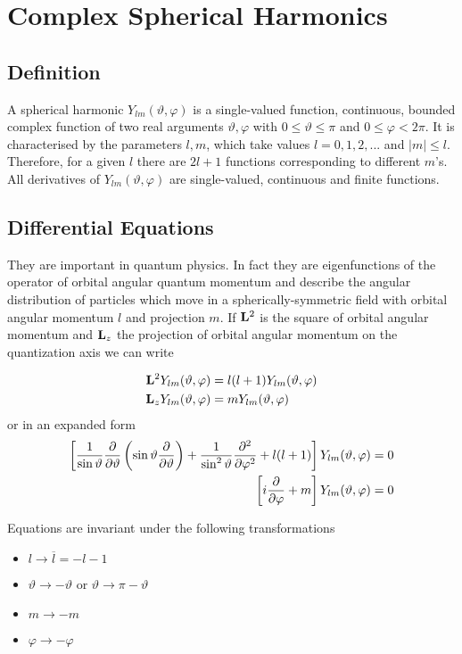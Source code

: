 \section{Complex Spherical Harmonics}
\subsection{Definition}
 \par{A spherical harmonic $Y_{lm}(\vartheta,\varphi)$ is a single-valued function,
continuous, bounded complex function of two real arguments $\vartheta,\varphi$ with
$0\le \vartheta \le \pi$ and $0\le \varphi <2\pi$. It is characterised by the
parameters $l,m$, which take values $l=0,1,2,...$ and $|m| \le l$. Therefore, for
a given $l$ there are $2l+1$ functions corresponding to different $m$'s. All
derivatives of $Y_{lm}(\vartheta,\varphi)$ are single-valued, continuous and finite
functions.}
\subsection{Differential Equations}
\par{They are important in quantum physics. In fact they are eigenfunctions of
the operator of orbital angular quantum momentum and describe the angular
distribution of particles which move in a spherically-symmetric field with
orbital angular momentum $l$ and projection $m$. If ${\bf L}^2$ is the square
of orbital angular momentum and ${\bf L}_z$ the projection of orbital angular
momentum on the quantization axis we can write}
 
\begin{equation}
 \begin{split}
 {\bf L}^2Y_{lm}(\vartheta,\varphi)&=l(l+1)Y_{lm}(\vartheta,\varphi)\\
 {\bf L}_zY_{lm}(\vartheta,\varphi)&=mY_{lm}(\vartheta,\varphi)
 \end{split}
 \end{equation}
or in an expanded form
\begin{equation}
\label{sphdiff}
\begin{split}
\left[\frac{1}{\sin \vartheta}\frac{\partial }{\partial \vartheta}\left(\sin \vartheta
    \frac{\partial }{\partial \vartheta}\right)+\frac{1}{\sin^2
    \vartheta}\frac{\partial^{2} }{\partial \varphi^{2}}+l(l+1)\right]Y_{lm}(\vartheta,\varphi)&=0\\
\left[i\frac{\partial }{\partial \varphi}+m\right]Y_{lm}(\vartheta,\varphi)&=0
\end{split}
\end{equation}
\par{Equations  are invariant under the following transformations}
\begin{itemize}
\item $l\rightarrow \overline{l}=-l-1$
\item $\vartheta \rightarrow -\vartheta$ or $\vartheta \rightarrow
  \pi-\vartheta$
\item $m\rightarrow -m$
\item $\varphi \rightarrow -\varphi$
\end{itemize}
